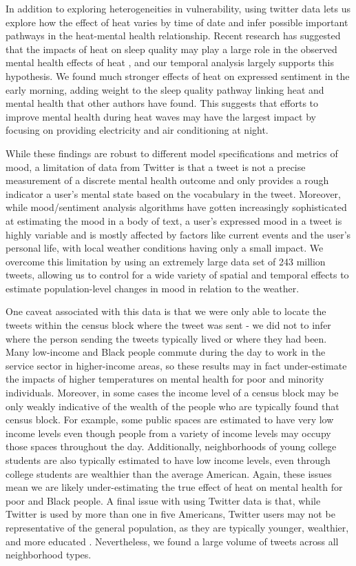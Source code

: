\documentclass[fleqn,10pt]{wlscirep}
\begin{document}
In addition to exploring heterogeneities in vulnerability, using twitter data lets us explore how the effect of heat varies by time of date and infer possible important pathways in the heat-mental health relationship. Recent research has suggested that the impacts of heat on sleep quality may play a large role in the observed mental health effects of heat \cite{Obradovich2017May, Mullins2019Dec}, and our temporal analysis largely supports this hypothesis.  We found much stronger effects of heat on expressed sentiment in the early morning, adding weight to the sleep quality pathway linking heat and mental health that other authors have found.  This suggests that efforts to improve mental health during heat waves may have the largest impact by focusing on providing electricity and air conditioning at night.


While these findings are robust to different model specifications and metrics of mood, a limitation of data from Twitter is that a tweet is not a precise measurement of a discrete mental health outcome and only provides a rough indicator a user's mental state based on the vocabulary in the tweet. Moreover, while mood/sentiment analysis algorithms have gotten increasingly sophisticated at estimating the mood in a body of text, a user's expressed mood in a tweet is highly variable and is mostly affected by factors like current events and the user's personal life, with local weather conditions having only a small impact. We overcome this limitation by using an extremely large data set of 243 million tweets, allowing us to control for a wide variety of spatial and temporal effects to estimate population-level changes in mood in relation to the weather.

One caveat associated with this data is that we were only able to locate the tweets within the census block where the tweet was sent - we did not to infer where the person sending the tweets typically lived or where they had been. Many low-income and Black people commute during the day to work in the service sector in higher-income areas, so these results may in fact under-estimate the impacts of higher temperatures on mental health for poor and minority individuals. Moreover, in some cases the income level of a census block may be only weakly indicative of the wealth of the people who are typically found that census block. For example, some public spaces are estimated to have very low income levels even though people from a variety of income levels may occupy those spaces throughout the day. Additionally, neighborhoods of young college students are also typically estimated to have low income levels, even through college students are wealthier than the average American. Again, these issues mean we are likely under-estimating the true effect of heat on mental health for poor and Black people. A final issue with using Twitter data is that, while Twitter is used by more than one in five Americans, Twitter users may not be representative of the general population, as they are typically younger, wealthier, and more educated \cite{Pew2020Sep}. Nevertheless, we found a large volume of tweets across all neighborhood types.
\end{document}
